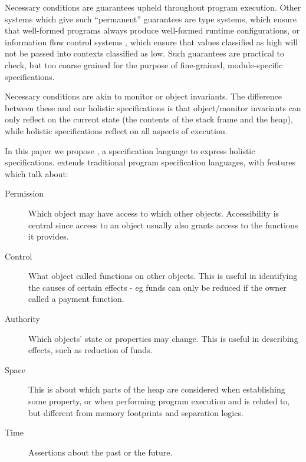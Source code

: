 Necessary conditions are guarantees upheld throughout program execution.
Other systems which give such ``permanent'' guarantees are  type systems, 
which ensure that well-formed programs  always produce well-formed runtime
configurations, or information flow control systems \cite{infoflow}, which ensure that values 
classified as high  will not be passed into contexts classified as low. 
Such  guarantees %
 are  practical to check, but   too coarse grained
for the purpose of fine-grained,  module-specific specifications. 

Necessary conditions are  akin to monitor or object invariants\cite{Hoare74,Meyer97}. The difference between
these and our holistic specifications is that object/monitor invariants can only reflect  on
the current state (\ie the contents of the
stack frame and the heap), while  holistic specifications reflect on all aspects of execution.

In this paper we propose \Chainmail, a specification language to express holistic specifications. \Chainmail extends 
traditional program specification languages\cite{jml,Eiffel}, with features which talk about:

\begin{description}
\item[Permission] Which object may have access to which other objects. 
Accessibility is central since access to an object usually also grants access to the functions it provides.

\item[Control] What object called functions on other objects. This is useful in identifying the causes of certain effects - eg 
funds can only be reduced if the owner called a payment function.

\item[Authority]  Which objects' state or properties may change. This is useful in describing effects, such as reduction of funds.

\item[Space] This is about which parts of the heap are considered when establishing some property, or when 
performing program execution and is
related to, but different from memory footprints and separation logics.

\item[Time] Assertions about the past or the future.
\end{description}


